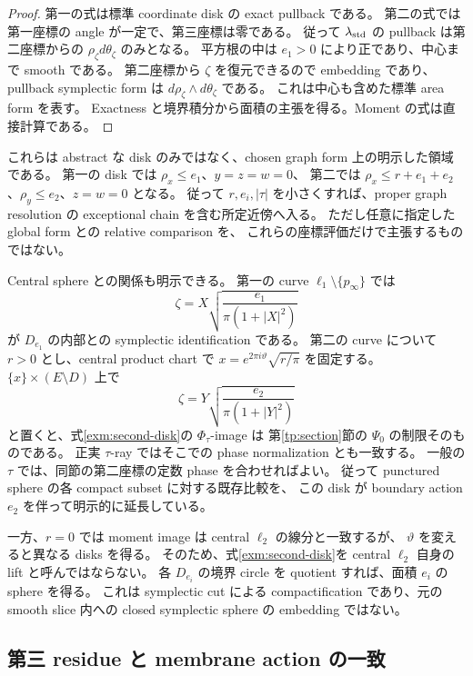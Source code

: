 \begin{proof}
第一の式は標準 coordinate disk の exact pullback である。
第二の式では第一座標の angle が一定で、第三座標は零である。
従って $\lambda_{\rm std}$ の pullback は第二座標からの
$\rho_\zeta d\theta_\zeta$ のみとなる。
平方根の中は $e_1>0$ により正であり、中心まで smooth である。
第二座標から $\zeta$ を復元できるので embedding であり、
pullback symplectic form は $d\rho_\zeta\wedge d\theta_\zeta$ である。
これは中心も含めた標準 area form を表す。
Exactness と境界積分から面積の主張を得る。Moment の式は直接計算である。
\end{proof}

これらは abstract な disk のみではなく、chosen graph form 上の明示した領域である。
第一の disk では $\rho_x\le e_1$、$y=z=w=0$、
第二では $\rho_x\le r+e_1+e_2$、$\rho_y\le e_2$、$z=w=0$ となる。
従って $r,e_i,|\tau|$ を小さくすれば、proper graph resolution の
exceptional chain を含む所定近傍へ入る。
ただし任意に指定した global form との relative comparison を、
これらの座標評価だけで主張するものではない。

Central sphere との関係も明示できる。
第一の curve $\ell_1\setminus\{p_\infty\}$ では
\[
 \zeta=X\sqrt{\frac{e_1}{\pi(1+|X|^2)}}
\]
が $D_{e_1}$ の内部との symplectic identification である。
第二の curve について $r>0$ とし、central product chart で
$x=e^{2\pi i\vartheta}\sqrt{r/\pi}$ を固定する。
$\{x\}\times(E\setminus D)$ 上で
\[
 \zeta=Y\sqrt{\frac{e_2}{\pi(1+|Y|^2)}}
\]
と置くと、式\eqref{exm:second-disk}の $\Phi_\tau$-image は
第\ref{tp:section}節の $\Psi_0$ の制限そのものである。
正実 $\tau$-ray ではそこでの phase normalization とも一致する。
一般の $\tau$ では、同節の第二座標の定数 phase を合わせればよい。
従って punctured sphere の各 compact subset に対する既存比較を、
この disk が boundary action $e_2$ を伴って明示的に延長している。

一方、$r=0$ では moment image は central $\ell_2$ の線分と一致するが、
$\vartheta$ を変えると異なる disks を得る。
そのため、式\eqref{exm:second-disk}を central $\ell_2$ 自身の lift と呼んではならない。
各 $D_{e_i}$ の境界 circle を quotient すれば、面積 $e_i$ の sphere を得る。
これは symplectic cut による compactification
\cite[\S1.1]{lerman-cut-local} であり、元の smooth slice 内への
closed symplectic sphere の embedding ではない。

\subsection{第三 residue と membrane action の一致}


